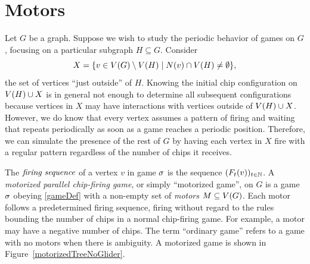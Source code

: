 \section{Motors}\label{motors}

Let $G$ be a graph. Suppose we wish to study the periodic behavior of games on
$G$, focusing on a particular subgraph $H \subseteq G$. Consider
\begin{equation*}
  X = \set{v \in \V \setminus \V[H]}{\N{v} \cap \V[H] \neq \emptyset},
\end{equation*}
the set of vertices ``just outside'' of $H$. Knowing the initial chip
configuration on $\V[H] \cup X$ is in general not enough to determine all
subsequent configurations because vertices in $X$ may have interactions with
vertices outside of $\V[H] \cup X$. However, we do know that every vertex
assumes a pattern of firing and waiting that repeats periodically as soon as a
game reaches a periodic position. Therefore, we can simulate the presence of
the rest of $G$ by having each vertex in $X$ fire with a regular pattern
regardless of the number of chips it receives.

The $\emph{firing sequence}$ of a vertex $v$ in game $\s$ is the sequence
$(\firing{v}{t})_{t \in \nats}$. A \emph{motorized parallel chip-firing game},
or simply ``motorized game'', on $G$ is a game $\s$ obeying \eqref{gameDef}
with a non-empty set of \emph{motors} $\mots \subseteq \V$. Each motor follows
a predetermined firing sequence, firing without regard to the rules bounding
the number of chips in a normal chip-firing game. For example, a motor may have
a negative number of chips. The term ``ordinary game'' refers to a game with no
motors when there is ambiguity. A motorized game is shown in
Figure~\ref{motorizedTreeNoGlider}.

